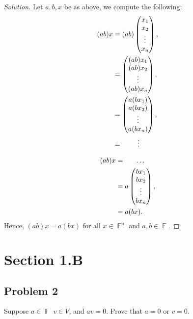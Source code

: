 \documentclass[letterpaper, 12pt]{amsart}
\DeclareMathOperator{\F}{\mathbb{F}}
\theoremstyle{definition}  %
\begin{document}
		\begin{proof}[Solution]
		Let $a,b,x$ be as above, we compute the following:
		\begin{align*}
		(ab)x &= (ab) \begin{pmatrix} x_{1} \\ x_{2} \\ \vdots \\ x_{n} \end{pmatrix}, \\
		&= \begin{pmatrix} (ab)x_{1} \\ (ab)x_{2} \\ \vdots \\ (ab)x_{n} \end{pmatrix}, \\
		&= \begin{pmatrix} a(bx_{1}) \\ a(bx_{2}) \\ \vdots \\ a(bx_{n}) \end{pmatrix}, \\
		&= \hspace{8mm} \vdots
		\end{align*}
		\pagebreak
		
		\begin{align*}
		(ab)x &= \hspace{6mm} \dots \\
		&= a\begin{pmatrix} bx_{1} \\ bx_{2} \\ \vdots \\ bx_{n} \end{pmatrix}, \\
		&= a (bx).
		\end{align*}
		Hence, $(ab)x = a(bx)$ for all $x \in \F^{n}$ and $a,b \in \F$.
		\end{proof}

	\section*{Section 1.B}
		\subsection*{Problem 2}
		Suppose $a \in \F$ $v \in V$, and $av = 0$.
		Prove that $a = 0$ or $v = 0$.
\end{document}
